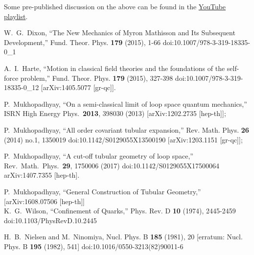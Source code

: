 \documentclass[
article,12pt]{article}
\begin{document}
Some pre-published discussion on the above can be found in the
\href{https://youtube.com/playlist?list=PLLgNOPmTPi1_riYtTFPtui_pHjY7hT8Rt&si=Ubg2pZX7ba1ZDJBX}{YouTube playlist}. 


\begin{thebibliography}{99}

W.~G.~Dixon,
``The New Mechanics of Myron Mathisson and Its Subsequent Development,''
Fund. Theor. Phys. \textbf{179} (2015), 1-66
doi:10.1007/978-3-319-18335-0\_1

A.~I.~Harte,
``Motion in classical field theories and the foundations of the self-force problem,''
Fund. Theor. Phys. \textbf{179} (2015), 327-398
doi:10.1007/978-3-319-18335-0\_12
[arXiv:1405.5077 [gr-qc]].

    
P.~Mukhopadhyay,
``On a semi-classical limit of loop space quantum mechanics,''
ISRN High Energy Phys.\  {\bf 2013}, 398030 (2013)
[arXiv:1202.2735 [hep-th]];

P.~Mukhopadhyay,
``All order covariant tubular expansion,''
Rev. Math. Phys. \textbf{26} (2014) no.1, 1350019
doi:10.1142/S0129055X13500190
[arXiv:1203.1151 [gr-qc]];

P.~Mukhopadhyay,
``A cut-off tubular geometry of loop space,''
Rev.\ Math.\ Phys.\  {\bf 29}, 1750006 (2017)
  doi:10.1142/S0129055X17500064
arXiv:1407.7355 [hep-th].

P.~Mukhopadhyay,
``General Construction of Tubular Geometry,''
[arXiv:1608.07506 [hep-th]] \\

K.~G.~Wilson,
``Confinement of Quarks,''
Phys. Rev. D \textbf{10} (1974), 2445-2459
doi:10.1103/PhysRevD.10.2445

H.~B.~Nielsen and M.~Ninomiya,
Nucl. Phys. B \textbf{185} (1981), 20
[erratum: Nucl. Phys. B \textbf{195} (1982), 541]
doi:10.1016/0550-3213(82)90011-6


\end{thebibliography}
\end{document}
